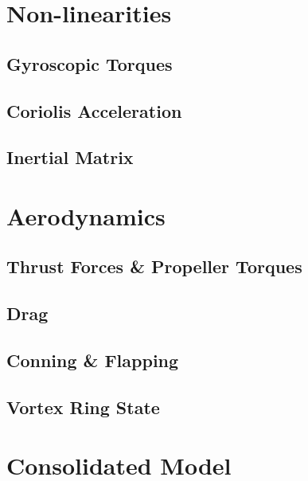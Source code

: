 \section{Non-linearities}
\label{sec:dynamics.nonlinearities}
\subsection{Gyroscopic Torques}
\label{subsec:dynamics.nonlinearities.gyrotorques}
\subsection{Coriolis Acceleration}
\label{subsec:dynamics.nonlinearities.coriolis}
\subsection{Inertial Matrix}
\label{subsec:dynamics.nonlinearities.inertia}

\section{Aerodynamics}
\label{sec:dynamics.aero}
\subsection{Thrust Forces \& Propeller Torques}
\label{subsec:dynamics.aero.bem}
\subsection{Drag}
\label{subsec:dynamics.aero.drag}
\subsection{Conning \& Flapping}
\label{subsec:dynamics.aero.flap}
\subsection{Vortex Ring State}
\label{subsec:dynamics.aero.vrs}

\section{Consolidated Model}
\label{sec:dynamics.model}